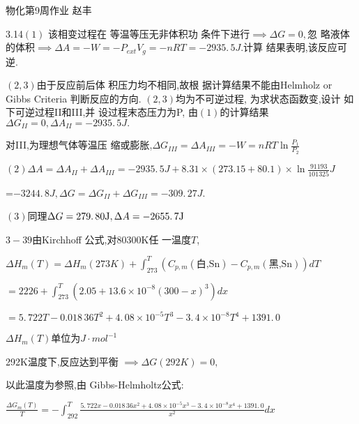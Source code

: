 \documentclass{ctexart}
\begin{document}
\bigskip \bigskip 物化第9周作业\qquad 
赵丰

3.14$\left( 1\right) $ 该相变过程在%
等温等压无非体积功%
条件下进行$\implies \Delta G=0,$忽%
略液体的体积$\implies \Delta
A=-W=-P_{ext}V_{g}=-nRT=-2935.\,\allowbreak 5\unit{J}.$计算%
结果表明,该反应可逆.

$\left( 2,3\right) $由于反应前后体%
积压力均不相同,故根%
据计算结果不能由Helmholz or
Gibbs Criteria 判断反应的方向. $%
\left( 2,3\right) $均为不可逆过程,%
为求状态函数变,设计%
如下可逆过程II和III,并%
设过程末态压力为P, 由$%
\left( 1\right) $的计算结果$\Delta
G_{II}=0,\Delta A_{II}=-2935.\,\allowbreak 5\unit{J}.$


对III,为理想气体等温压%
缩或膨胀,$\Delta G_{III}=\Delta A_{III}=-W=nRT\ln 
\frac{P_{1}}{P_{2}}$

$\left( 2\right) \Delta A=\Delta A_{II}+\Delta A_{III}=-2935.\,5\unit{J}%
+8.31\times \left( 273.15+80.1\right) \times \ln \frac{91193}{101325}\unit{J}
$

=$-3244.\,\allowbreak 8\unit{J},\Delta G=\Delta G_{II}+\Delta
G_{III}=-309.\,\allowbreak 27\unit{J}.$

$\left( 3\right) $同理$\allowbreak \Delta G=\allowbreak
279.\,\allowbreak 80\unit{J},\Delta A=\allowbreak -2655.\,\allowbreak 7\unit{%
J}$

$3-39$由Kirchhoff 公式,对80300K任%
一温度$T$,

$\Delta H_{m}\left( T\right) =\Delta H_{m}\left( 273K\right)
+\int_{273}^{T}\left( C_{p,m}\left( \text{白,Sn}\right) -C_{p,m}\left( 
\text{黑,Sn}\right) \right) dT$

$=2226+\int_{273}^{T}\left( 2.05+13.6\times 10^{-8}\left( 300-x\right)
^{3}\right) dx$

$=\allowbreak 5.\,\allowbreak 722T-0.018\,36T^{2}+4.\,\allowbreak 08\times
10^{-5}T^{3}-3.\,\allowbreak 4\times 10^{-8}\allowbreak
T^{4}+1391.\,\allowbreak 0$

\bigskip $\Delta H_{m}\left( T\right) $单位为$\unit{J}%
\cdot \unit{mol}^{-1}$

292K温度下,反应达到平衡%
$\implies \Delta G\left( 292K\right) =0,$

以此温度为参照,由%
Gibbs-Helmholtz公式:

$\frac{\Delta G_{m}\left( T\right) }{T}=-\int_{292}^{T}\frac{5.\,\allowbreak
722x-0.018\,36x^{2}+4.\,\allowbreak 08\times 10^{-5}x^{3}-3.\,\allowbreak
4\times 10^{-8}\allowbreak x^{4}+1391.\,\allowbreak 0}{x^{2}}dx$
\end{document}

